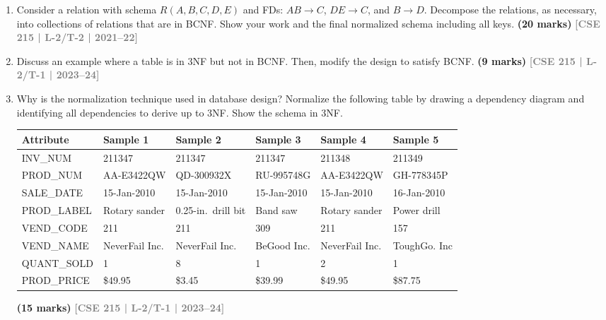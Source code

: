 \documentclass[12pt,a3paper]{article}
\newcommand{\yr}[1]{\hfill\textcolor{gray}{\small\textbf{[#1]}}}
\newcommand{\mk}[1]{\textcolor{orange!70!black}{\small\textbf{(#1 marks)}}}
\begin{document}
\begin{enumerate}

\item Consider a relation with schema $R(A, B, C, D, E)$ and FDs: $AB \to C$, $DE \to C$, and $B \to D$. Decompose the relations, as necessary, into collections of relations that are in BCNF. Show your work and the final normalized schema including all keys.
\mk{20} \yr{CSE 215 | L-2/T-2 | 2021--22}



\item Discuss an example where a table is in 3NF but not in BCNF. Then, modify the design to satisfy BCNF.
\mk{9} \yr{CSE 215 | L-2/T-1 | 2023--24}

\item Why is the normalization technique used in database design? Normalize the following table by drawing a dependency diagram and identifying all dependencies to derive up to 3NF. Show the schema in 3NF.

\medskip
\begin{center}
\small
\begin{tabular}{llllll}
\toprule
\textbf{Attribute} & \textbf{Sample 1} & \textbf{Sample 2} & \textbf{Sample 3} & \textbf{Sample 4} & \textbf{Sample 5}\\
\midrule
INV\_NUM    & 211347 & 211347 & 211347 & 211348 & 211349\\
PROD\_NUM   & AA-E3422QW & QD-300932X & RU-995748G & AA-E3422QW & GH-778345P\\
SALE\_DATE  & 15-Jan-2010 & 15-Jan-2010 & 15-Jan-2010 & 15-Jan-2010 & 16-Jan-2010\\
PROD\_LABEL & Rotary sander & 0.25-in.\ drill bit & Band saw & Rotary sander & Power drill \\
VEND\_CODE  & 211 & 211 & 309 & 211 & 157\\
VEND\_NAME  & NeverFail Inc. & NeverFail Inc. & BeGood Inc. & NeverFail Inc. & ToughGo. Inc\\
QUANT\_SOLD & 1 & 8 & 1 & 2 & 1\\
PROD\_PRICE & \$49.95 & \$3.45 & \$39.99 & \$49.95 & \$87.75\\
\bottomrule
\end{tabular}
\end{center}
\mk{15} \yr{CSE 215 | L-2/T-1 | 2023--24}


\end{enumerate}
\end{document}
